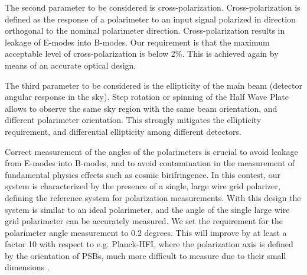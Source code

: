 The second parameter to be considered is cross-polarization. Cross-polarization is defined as the
response of a polarimeter to an input signal polarized in direction orthogonal to the nominal
polarimeter direction. Cross-polarization results in leakage of E-modes into B-modes. 
Our requirement is that the maximum acceptable level of cross-polarization is below 2\%. 
This is achieved again by means of an accurate optical design.

The third parameter to be considered is the ellipticity of the main beam (detector angular response 
in the sky). Step rotation or spinning of
the Half Wave Plate allows to observe the same sky region with the same beam orientation, and
different polarimeter orientation. This strongly mitigates the ellipticity requirement, and differential 
ellipticity among different detectors. 

Correct measurement of the angles of the polarimeters is crucial to avoid leakage from E-modes into
B-modes, and to avoid contamination in the measurement of fundamental physics effects such as
cosmic birifringence. In this contest, our system is characterized by the presence of a single, large
wire grid polarizer, defining the reference system for polarization measurements. With this design
the system is similar to an ideal polarimeter, and the angle of the single large wire grid polarimeter
can be accurately measured. We set the requirement for the polarimeter angle measurement to
0.2 degrees. This will improve by at least a factor 10 with respect to e.g. Planck-HFI, where the
polarization axis is defined by the orientation of PSBs, much more difficult to measure due to their
small dimensions \citep{rosset2010}.

